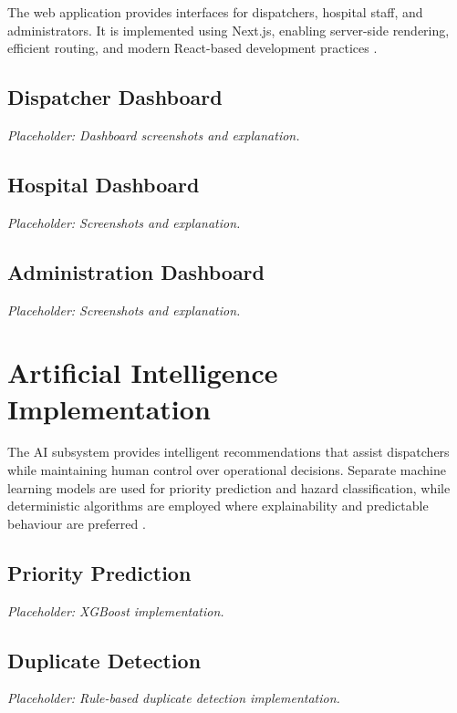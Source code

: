 The web application provides interfaces for dispatchers, hospital staff, and administrators. It is implemented using Next.js, enabling server-side rendering, efficient routing, and modern React-based development practices \cite{nextjs}.

\subsection{Dispatcher Dashboard}

\textit{Placeholder: Dashboard screenshots and explanation.}

\subsection{Hospital Dashboard}

\textit{Placeholder: Screenshots and explanation.}

\subsection{Administration Dashboard}

\textit{Placeholder: Screenshots and explanation.}


\section{Artificial Intelligence Implementation}

The AI subsystem provides intelligent recommendations that assist dispatchers while maintaining human control over operational decisions. Separate machine learning models are used for priority prediction and hazard classification, while deterministic algorithms are employed where explainability and predictable behaviour are preferred \cite{xgboost,mobilenetv2}.

\subsection{Priority Prediction}

\textit{Placeholder: XGBoost implementation.}

\subsection{Duplicate Detection}

\textit{Placeholder: Rule-based duplicate detection implementation.}

